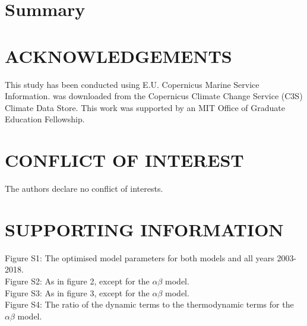 \documentclass[alpha-refs]{wiley-article}
\newcommand{\beginsupplement}{%
\setcounter{table}{0}
        \renewcommand{\thetable}{S\arabic{table}}%
        \setcounter{figure}{0}
        \renewcommand{\thefigure}{S\arabic{figure}}%
     }
\begin{document}
\section{Summary\label{Sec:Conclusion}}


\beginsupplement

%


\section*{ACKNOWLEDGEMENTS}
This study has been conducted using E.U. Copernicus Marine Service Information. \citep{ERA5_data} was downloaded from the Copernicus Climate Change Service (C3S) Climate Data Store. This work was supported by an MIT Office of Graduate Education Fellowship.

\section*{CONFLICT OF INTEREST}
The authors declare no conflict of interests.

\section*{SUPPORTING INFORMATION}

\noindent Figure S1: The optimised model parameters for both models and all years 2003-2018.\\
Figure S2: As in figure 2, except for the $\alpha\beta$ model.\\
Figure S3: As in figure 3, except for the $\alpha\beta$ model.\\
Figure S4: The ratio of the dynamic terms to the thermodynamic terms for the $\alpha\beta$ model.




\end{document}
